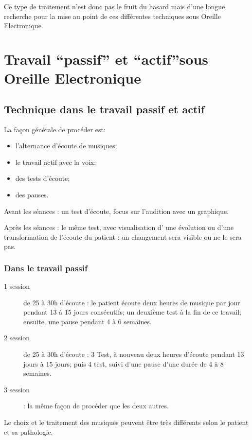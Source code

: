 Ce type de traitement n'est donc pas le fruit du hasard mais d'une
longue recherche pour la mise au point de ces différentes techniques
sous Oreille Electronique.

\section{Travail ``passif'' et ``actif''sous Oreille Electronique}

\subsection{Technique dans le travail passif et actif}

La façon générale de procéder est:
\begin{itemize}
\item  l'alternance d'écoute de musiques;
\item le travail actif avec la voix;
\item des tests d'écoute;
\item des pauses.
\end{itemize}

Avant les séances : un test d'écoute, focus sur l'audition avec un
graphique.

Après les séances : le même test, avec visualisation d' une évolution
ou d'une transformation de l'écoute du patient : un changement sera
visible ou ne le sera pas.

\subsubsection{Dans le travail passif}

\begin{description}
\item [{1 session}] de 25 à 30h d'écoute : le patient écoute
deux heures de musique par jour pendant 13 à 15 jours consécutifs;
un deuxième test à la fin de ce travail; ensuite, une pause pendant
4 à 6 semaines.
\item [{2 session}] de 25 à 30h d'écoute : 3 Test, à nouveau
deux heures d'écoute pendant 13 jours à 15 jours; puis 4 test,
suivi d'une pause d'une durée de 4 à 8 semaines.
\item [{3 session}] : la même façon de procéder que les deux
autres. 
\end{description}
Le choix et le traitement des musiques peuvent être très différents
selon le patient et sa pathologie.

